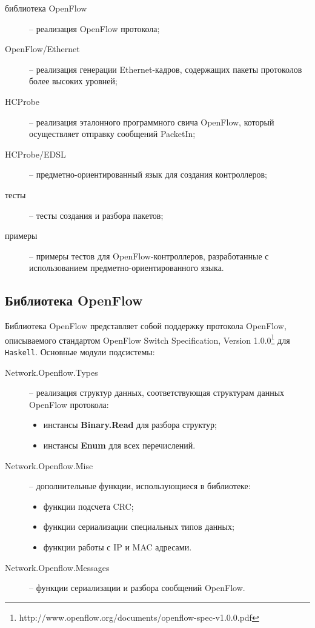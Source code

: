 \documentclass[9pt,a4paper]{article}
\begin{document}
\begin{description}
    \item[библиотека OpenFlow] -- реализация OpenFlow протокола;
    \item[OpenFlow/Ethernet] -- реализация генерации Ethernet-кадров, содержащих
      пакеты протоколов более высоких уровней;
    \item[HCProbe] -- реализация эталонного программного свича OpenFlow, который
      осуществляет отправку сообщений PacketIn;
    \item[HCProbe/EDSL] -- предметно-ориентированный язык для создания
      контроллеров;
    \item[тесты] -- тесты создания и разбора пакетов;
    \item[примеры] -- примеры тестов для OpenFlow-контроллеров, разработанные с
      использованием предметно-ориентированного языка.
\end{description}


\subsection{Библиотека OpenFlow}

Библиотека OpenFlow представляет собой поддержку протокола OpenFlow,
описываемого стандартом OpenFlow Switch Specification, Version 1.0.0\footnote{http://www.openflow.org/documents/openflow-spec-v1.0.0.pdf} для
\texttt{Haskell}. Основные модули подсистемы:

\begin{description}
    \item[Network.Openflow.Types] -- реализация структур данных, соответствующая
      структурам данных OpenFlow протокола:
        \begin{itemize}
            \item инстансы \textbf{Binary.Read} для разбора структур;
            \item инстансы \textbf{Enum} для всех перечислений.
        \end{itemize}
    \item[Network.Openflow.Misc] -- дополнительные функции, использующиеся в
      библиотеке:
        \begin{itemize}
            \item функции подсчета CRC;
            \item функции сериализации специальных типов данных;
            \item функции работы с IP и MAC адресами.
        \end{itemize}
    \item[Network.Openflow.Messages] -- функции сериализации и разбора сообщений
      OpenFlow.
\end{description}
\end{document}
